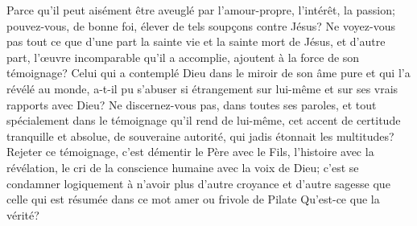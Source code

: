 Parce qu’il peut aisément être aveuglé par l’amour-propre, l’intérêt, la passion;
pouvez-vous, de bonne foi, élever de tels soupçons contre Jésus?
Ne voyez-vous pas tout ce que d’une part la sainte vie et la sainte mort de Jésus, et d’autre part,
l’œuvre incomparable qu’il a accomplie, ajoutent à la force de son témoignage?
Celui qui a contemplé Dieu dans le miroir de son âme pure et qui l’a révélé au monde, a-t-il pu s’abuser si étrangement
sur lui-même et sur ses vrais rapports avec Dieu?
Ne discernez-vous pas, dans toutes ses paroles, et tout spécialement dans le témoignage qu’il rend de lui-même,
cet accent de certitude tranquille et absolue, de souveraine autorité, qui jadis étonnait les multitudes?
Rejeter ce témoignage, c’est démentir le Père avec le Fils, l’histoire avec la révélation,
le cri de la conscience humaine avec la voix de Dieu;
c’est se condamner logiquement à n’avoir plus d’autre croyance et d’autre sagesse
que celle qui est résumée dans ce mot amer ou frivole de Pilate\frcolon{} \Og{} Qu’est-ce que la vérité?\Fg{}

